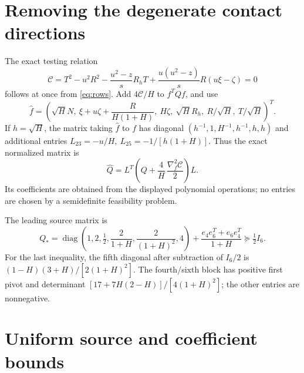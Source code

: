 \documentclass[10pt]{article}
\begin{document}
\section{Removing the degenerate contact directions}

The exact testing relation
\begin{equation}
 \mathcal C=T^2-u^2R^2-\frac{u^2-z}{s}R_hT
                 +\frac{u(u^2-z)}sR(u\xi-\zeta)=0             \label{eq:conductor}
\end{equation}
follows at once from \eqref{eq:rows}. Add \(4\mathcal C/H\) to
\(f^TQf\), and use
\begin{equation}
 \widehat f=\left(\sqrt HN,\ \xi+u\zeta+\frac R{H(1+H)},\
 H\zeta,\ \sqrt HR_h,\ R/\sqrt H,\ T/\sqrt H\right)^T. \label{eq:newroots}
\end{equation}
If \(h=\sqrt H\), the matrix taking \(\widehat f\) to \(f\) has diagonal
\((h^{-1},1,H^{-1},h^{-1},h,h)\) and additional entries
\(L_{23}=-u/H,\ L_{25}=-1/[h(1+H)]\).
Thus the exact normalized matrix is
\begin{equation}
 \widehat Q=L^T\left(Q+\frac4H\,
                      \frac{\nabla_f^2\mathcal C}{2}\right)L. \label{eq:normalized}
\end{equation}
Its coefficients are obtained from the displayed polynomial operations;
no entries are chosen by a semidefinite feasibility problem.

The leading source matrix is
\begin{equation}
 Q_*=\operatorname{diag}
 \left(1,2,\tfrac12,\frac2{1+H},\frac2{(1+H)^2},4\right)
 +\frac{e_4e_6^T+e_6e_4^T}{1+H}\succeq\tfrac12 I_6. \label{eq:baseline}
\end{equation}
For the last inequality, the fifth diagonal after subtraction of
\(I_6/2\) is \((1-H)(3+H)/[2(1+H)^2]\). The fourth/sixth block has
positive first pivot and determinant
\([17+7H(2-H)]/[4(1+H)^2]\); the other entries are nonnegative.

\section{Uniform source and coefficient bounds}
\end{document}
